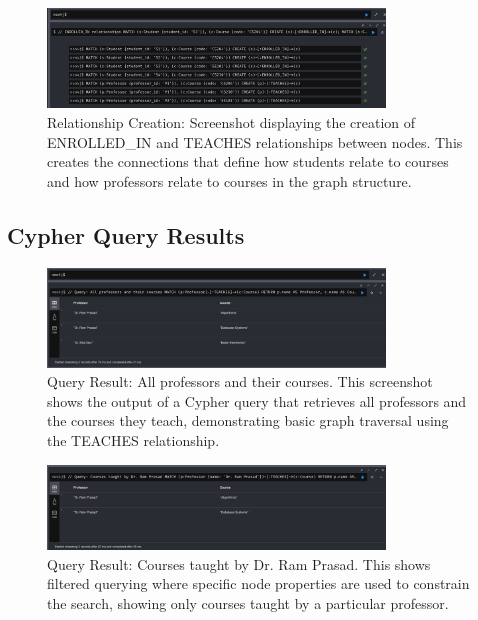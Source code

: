 \begin{figure}[H]
  \centering
  \includegraphics[width=0.8\textwidth]{task-3/screenshots/create-relationships.png}
  \caption{Relationship Creation: Screenshot displaying the creation of ENROLLED\_IN and TEACHES relationships between nodes. This creates the connections that define how students relate to courses and how professors relate to courses in the graph structure.}
  \label{fig:task3-create-relationships}
\end{figure}

\subsection*{Cypher Query Results}

\begin{figure}[H]
  \centering
  \includegraphics[width=0.8\textwidth]{task-3/screenshots/all-prof-and-their-courses.png}
  \caption{Query Result: All professors and their courses. This screenshot shows the output of a Cypher query that retrieves all professors and the courses they teach, demonstrating basic graph traversal using the TEACHES relationship.}
  \label{fig:task3-all-prof-courses}
\end{figure}

\begin{figure}[H]
  \centering
  \includegraphics[width=0.8\textwidth]{task-3/screenshots/course-by-prof-ram-prasad.png}
  \caption{Query Result: Courses taught by Dr. Ram Prasad. This shows filtered querying where specific node properties are used to constrain the search, showing only courses taught by a particular professor.}
  \label{fig:task3-courses-ram}
\end{figure}

